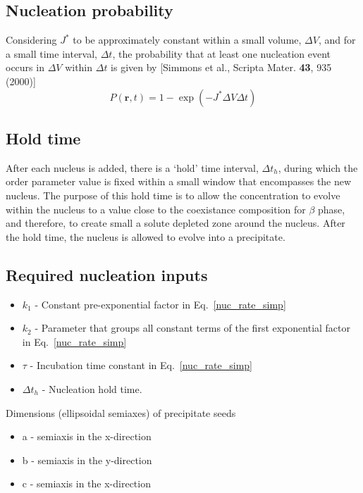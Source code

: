 \documentclass[11pt]{article}
\renewcommand{\=}[1]{\stackrel{#1}{=}} %
\theoremstyle{definition}
\theoremstyle{remark}
\begin{document}
\subsection{Nucleation probability}

Considering  $J^*$ to be approximately constant within a small volume, $\Delta V$, and for a small time interval, $\Delta t$, the probability that at least one nucleation event occurs in $\Delta V$ within $\Delta t$ is given by [Simmons et al., Scripta Mater. {\bf 43}, 935 (2000)]
\\
\begin{equation}
\label{nuc_prob}
P(\mathbf{r},t) = 1 - \exp \left( -J^* \Delta V \Delta t \right)
\end{equation}
\subsection{Hold time}

After each nucleus is added, there is a `hold' time interval, $\Delta t_h$, during which the order parameter value is fixed within a small window that encompasses the new nucleus. The purpose of this hold time is to allow the concentration to evolve within the nucleus to a value close to the coexistance composition for $\beta$ phase, and therefore, to create small a solute depleted zone around the nucleus. After the hold time, the nucleus is allowed to evolve into a precipitate.

\subsection{Required nucleation inputs}
\begin{itemize}
\item $k_1$ - Constant pre-exponential factor in Eq.~\eqref{nuc_rate_simp}
\item $k_2$ - Parameter that groups all constant terms of the first exponential factor in Eq.~\eqref{nuc_rate_simp} 
\item $\tau$ - Incubation time constant in Eq.~\eqref{nuc_rate_simp}
\item $\Delta t_h$ - Nucleation hold time.
\end{itemize}
Dimensions (ellipsoidal semiaxes) of precipitate seeds
\begin{itemize}
\item a - semiaxis in the x-direction
\item b - semiaxis in the y-direction
\item c - semiaxis in the x-direction
\end{itemize}
\end{document}
